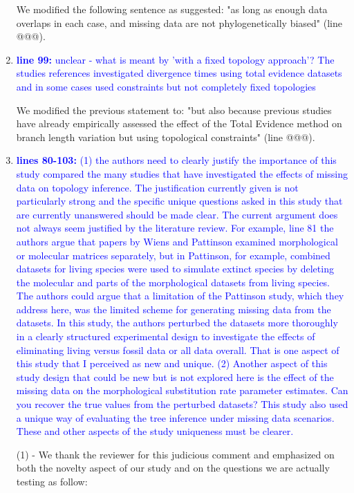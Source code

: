 \documentclass[12pt,letterpaper]{article}
\begin{document}
\begin{enumerate}
We modified the following sentence as suggested: "as long as enough data overlaps in each case, and missing data are not phylogenetically biased" (line @@@).

\item{\textcolor{blue}{\textbf{line 99:} unclear - what is meant by 'with a fixed topology approach'? The studies references investigated divergence times using total evidence datasets and in some cases used constraints but not completely fixed topologies}}

We modified the previous statement to: "but also because previous studies have already empirically assessed the effect of the Total Evidence method on branch length variation but using topological constraints" (line @@@).

\item{\textcolor{blue}{\textbf{lines 80-103:} (1) the authors need to clearly justify the importance of this study compared the many studies that have investigated the effects of missing data on topology inference.
The justification currently given is not particularly strong and the specific unique questions asked in this study that are currently unanswered should be made clear.
The current argument does not always seem justified by the literature review.
For example, line 81 the authors argue that papers by Wiens and Pattinson examined morphological or molecular matrices separately, but in Pattinson, for example, combined datasets for living species were used to simulate extinct species by deleting the molecular and parts of the morphological datasets from living species.
The authors could argue that a limitation of the Pattinson study, which they address here, was the limited scheme for generating missing data from the datasets.
In this study, the authors perturbed the datasets more thoroughly in a clearly structured experimental design to investigate the effects of eliminating living versus fossil data or all data overall.
That is one aspect of this study that I perceived as new and unique.
(2) Another aspect of this study design that could be new but is not explored here is the effect of the missing data on the morphological substitution rate parameter estimates.
Can you recover the true values from the perturbed datasets?
This study also used a unique way of evaluating the tree inference under missing data scenarios.
These and other aspects of the study uniqueness must be clearer.}}

(1) - We thank the reviewer for this judicious comment and emphasized on both the novelty aspect of our study and on the questions we are actually testing as follow:


\end{enumerate}
\end{document}
